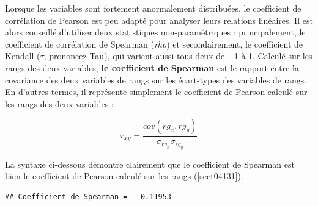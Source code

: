 \documentclass[
  11pt,
  french,
]{book}
\makeatletter
\newenvironment{Shaded}{\begin{snugshade}}{\end{snugshade}}
\newcommand{\CommentTok}[1]{\textcolor[rgb]{0.56,0.35,0.01}{\textit{#1}}}
\newcommand{\DataTypeTok}[1]{\textcolor[rgb]{0.13,0.29,0.53}{#1}}
\newcommand{\DecValTok}[1]{\textcolor[rgb]{0.00,0.00,0.81}{#1}}
\newcommand{\KeywordTok}[1]{\textcolor[rgb]{0.13,0.29,0.53}{\textbf{#1}}}
\newcommand{\NormalTok}[1]{#1}
\newcommand{\OperatorTok}[1]{\textcolor[rgb]{0.81,0.36,0.00}{\textbf{#1}}}
\newcommand{\StringTok}[1]{\textcolor[rgb]{0.31,0.60,0.02}{#1}}
\newenvironment{kframe}{%
\medskip{}
\setlength{\fboxsep}{.8em}
 \def\at@end@of@kframe{}%
 \ifinner\ifhmode%
  \def\at@end@of@kframe{\end{minipage}}%
  \begin{minipage}{\columnwidth}%
 \fi\fi%
 \def\FrameCommand##1{\hskip\@totalleftmargin \hskip-\fboxsep
 \colorbox{shadecolor}{##1}\hskip-\fboxsep
     \hskip-\linewidth \hskip-\@totalleftmargin \hskip\columnwidth}%
 \MakeFramed {\advance\hsize-\width
   \@totalleftmargin\z@ \linewidth\hsize
   \@setminipage}}%
 {\par\unskip\endMakeFramed%
 \at@end@of@kframe}
\renewenvironment{Shaded}{\begin{kframe}}{\end{kframe}}
\makeatother
\begin{document}
Lorsque les variables sont fortement anormalement distribuées, le coefficient de corrélation de Pearson est peu adapté pour analyser leurs relations linéaires. Il est alors conseillé d'utiliser deux statistiques non-paramétriques : principalement, le coefficient de corrélation de Spearman (\emph{rho}) et secondairement, le coefficient de Kendall (\(\tau\), prononcez Tau), qui varient aussi tous deux de −1 à 1.
Calculé sur les rangs des deux variables, \textbf{le coefficient de Spearman} est le rapport entre la covariance des deux variables de rangs sur les écart-types des variables de rangs. En d'autres termes, il représente simplement le coefficient de Pearson calculé sur les rangs des deux variables :

\begin{equation} 
r_{xy} = \frac{cov(rg_{x},rg_{y})}{\sigma_{rg_{x}}\sigma_{rg_{y}}}
\label{eq:spearman}
\end{equation}

La syntaxe ci-dessous démontre clairement que le coefficient de Spearman est bien le coefficient de Pearson calculé sur les rangs (\ref{sect04131}).

\begin{Shaded}
\end{Shaded}

\begin{verbatim}
## Coefficient de Spearman =  -0.11953
\end{verbatim}

\begin{Shaded}
\end{Shaded}
\end{document}
